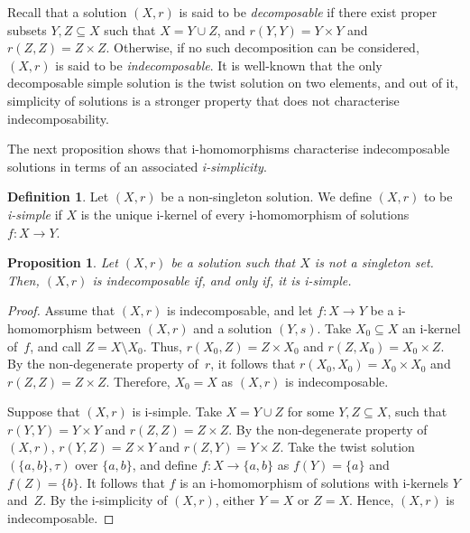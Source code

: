 \documentclass[12pt, a4paper, english]{article}
\newtheorem{proposicio}[teorema]{Proposition}
\theoremstyle{definition}
\newtheorem{definicio}[teorema]{Definition}
\theoremstyle{remark}
\newtheorem*{nota}{Remark}
\begin{document}
Recall that a solution $(X,r)$ is said to be \emph{decomposable} if there exist proper subsets $Y, Z \subseteq X$ such that $X = Y \cup Z$, and $r(Y,Y) = Y \times Y$ and $r(Z,Z) = Z \times Z$. Otherwise, if no such decomposition can be considered, $(X,r)$ is said to be \emph{indecomposable}. It is well-known that the only decomposable simple solution is the twist solution on two elements, and out of it, simplicity of solutions is a stronger property that does not characterise indecomposability.

The next proposition shows that i-homomorphisms characterise indecomposable solutions in terms of an associated \emph{i-simplicity}.

\begin{definicio}
Let $(X,r)$ be a non-singleton solution. We define $(X,r)$ to be \emph{i-simple} if $X$ is the unique i-kernel of every i-homomorphism of solutions $f\colon X \rightarrow Y$.
\end{definicio}


\begin{proposicio}
\label{prop:indecomp-i-simple}
Let $(X,r)$ be a solution such that $X$ is not a singleton set. Then, $(X,r)$ is indecomposable if, and only if, it is i-simple.
\end{proposicio}

\begin{proof}
Assume that $(X,r)$ is indecomposable, and let $f\colon X \rightarrow Y$ be a i-homomorphism between $(X,r)$ and a solution $(Y,s)$. Take $X_0\subseteq X$ an i-kernel of~$f$, and call $Z = X \setminus X_0$. Thus, $r(X_0,Z) = Z \times X_0$ and $r(Z,X_0) = X_0\times Z$. By the non-degenerate property of~$r$, it follows that $r(X_0, X_0) = X_0 \times X_0$ and $r(Z,Z) = Z \times Z$. Therefore, $X_0 = X$ as $(X,r)$ is indecomposable.

Suppose that $(X,r)$ is i-simple. Take $X = Y \cup Z$ for some $Y,Z \subseteq X$, such that $r(Y,Y) = Y \times Y$ and $r(Z,Z) = Z\times Z$. By the non-degenerate property of $(X,r)$, $r(Y,Z) = Z\times Y$ and $r(Z,Y) = Y\times Z$. Take the twist solution $(\{a,b\}, \tau)$ over $\{a,b\}$, and define $f\colon X \rightarrow \{a,b\}$ as $f(Y) = \{a\}$ and $f(Z) = \{b\}$. It follows that $f$ is an i-homomorphism of solutions with i-kernels $Y$ and~$Z$. By the i-simplicity of $(X,r)$, either $Y = X$ or $Z = X$. Hence, $(X,r)$ is indecomposable.
\end{proof}
\end{document}
